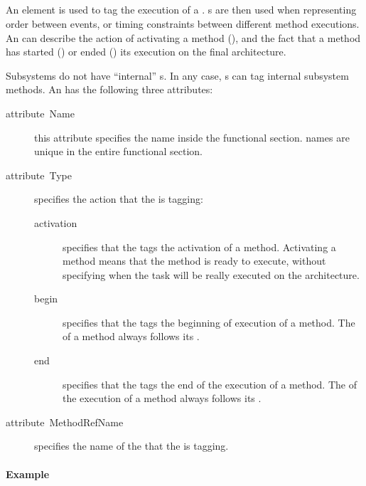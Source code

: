\subsection{}
\label{sub:EVENT}

An  element is used to tag the execution of a
.  s are then used when representing order
between events, or timing constraints between different method
executions. An  can describe the action of activating a
method (), and the fact that a method has started
() or ended () its execution on the final
architecture.

Subsystems do not have {}``internal'' s. In any case,
s can tag internal subsystem methods. An 
has the following three attributes:
\begin{description}
\item [{attribute~Name}] this attribute specifies the 
  name inside the functional section.  names are unique
  in the entire functional section.
\item [{attribute~Type}] specifies the action that the 
  is tagging:

  \begin{description}
  \item [{activation}] specifies that the  tags the activation
    of a method. Activating a method means that the method is ready to
    execute, without specifying when the task will be really executed
    on the architecture.
  \item [{begin}] specifies that the  tags the beginning of
    execution of a method. The  of a method always follows
    its .
  \item [{end}] specifies that the  tags the end of the execution
    of a method. The  of the execution of a method always
    follows its .
  \end{description}

\item [{attribute~MethodRefName}] specifies the name of the 
  that the  is tagging.
\end{description}

\paragraph{Example}

